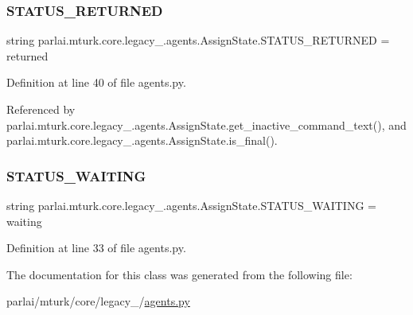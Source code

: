 \subsubsection{\texorpdfstring{S\+T\+A\+T\+U\+S\+\_\+\+R\+E\+T\+U\+R\+N\+ED}{STATUS\_RETURNED}}
{\footnotesize\ttfamily string parlai.\+mturk.\+core.\+legacy\+\_.\+agents.\+Assign\+State.\+S\+T\+A\+T\+U\+S\+\_\+\+R\+E\+T\+U\+R\+N\+ED = \textquotesingle{}returned\textquotesingle{}\hspace{0.3cm}{\ttfamily [static]}}



Definition at line 40 of file agents.\+py.



Referenced by parlai.\+mturk.\+core.\+legacy\+\_.\+agents.\+Assign\+State.\+get\+\_\+inactive\+\_\+command\+\_\+text(), and parlai.\+mturk.\+core.\+legacy\+\_.\+agents.\+Assign\+State.\+is\+\_\+final().

\mbox{\label{classparlai_1_1mturk_1_1core_1_1legacy__2018_1_1agents_1_1AssignState_ae3a8287c8a69502c98dd9792d6c98da8}} 
\subsubsection{\texorpdfstring{S\+T\+A\+T\+U\+S\+\_\+\+W\+A\+I\+T\+I\+NG}{STATUS\_WAITING}}
{\footnotesize\ttfamily string parlai.\+mturk.\+core.\+legacy\+\_.\+agents.\+Assign\+State.\+S\+T\+A\+T\+U\+S\+\_\+\+W\+A\+I\+T\+I\+NG = \textquotesingle{}waiting\textquotesingle{}\hspace{0.3cm}{\ttfamily [static]}}



Definition at line 33 of file agents.\+py.



The documentation for this class was generated from the following file\+:\begin{DoxyCompactItemize}
\item 
parlai/mturk/core/legacy\+\_/\hyperlink{parlai_2mturk_2core_2legacy__2018_2agents_8py}{agents.\+py}\end{DoxyCompactItemize}
